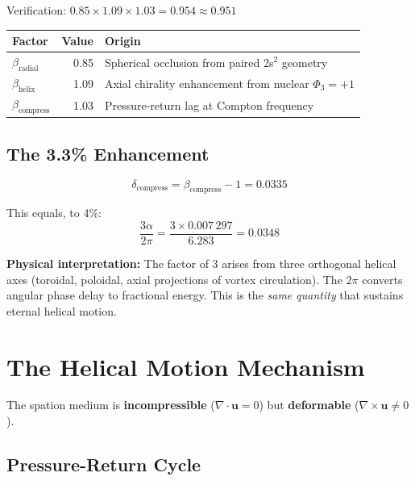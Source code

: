 Verification: $0.85 \times 1.09 \times 1.03 = 0.954 \approx 0.951$ \checkmark

\begin{center}
\begin{tabular}{lrl}
\hline
Factor & Value & Origin \\
\hline
$\beta_{\text{radial}}$ & 0.85 & Spherical occlusion from paired 2s$^2$ geometry \\
$\beta_{\text{helix}}$ & 1.09 & Axial chirality enhancement from nuclear $\Phi_3 = +1$ \\
$\beta_{\text{compress}}$ & 1.03 & Pressure-return lag at Compton frequency \\
\hline
\end{tabular}
\end{center}

\subsection{The 3.3\% Enhancement}

\begin{equation}\label{eq:delta-compress}
  \delta_{\text{compress}} = \beta_{\text{compress}} - 1 = 0.0335
\end{equation}

This equals, to 4\%:
\begin{equation}\label{eq:3alpha2pi}
  \frac{3\alpha}{2\pi} = \frac{3 \times 0.007\,297}{6.283} = 0.0348
\end{equation}

\textbf{Physical interpretation:} The factor of 3 arises from three orthogonal helical axes (toroidal, poloidal, axial projections of vortex circulation).  The $2\pi$ converts angular phase delay to fractional energy.  This is the \emph{same quantity} that sustains eternal helical motion.


\section{The Helical Motion Mechanism}

The spation medium is \textbf{incompressible} ($\nabla \cdot \mathbf{u} = 0$) but \textbf{deformable} ($\nabla \times \mathbf{u} \neq 0$).

\subsection{Pressure-Return Cycle}

